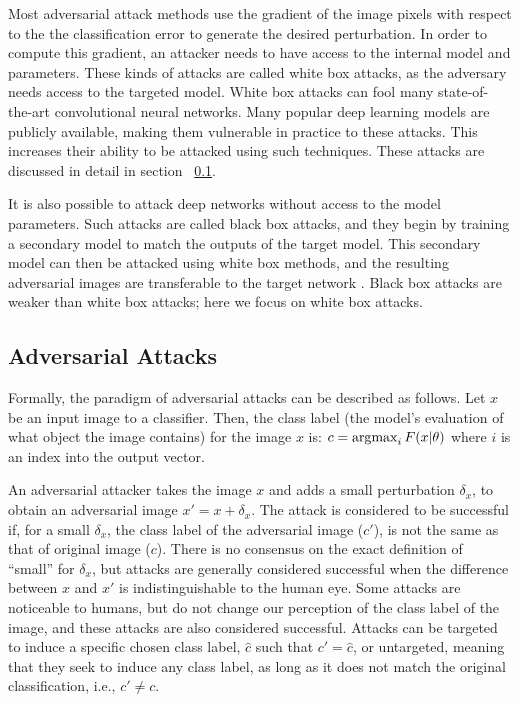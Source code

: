 Most adversarial attack methods use the gradient of the image pixels with respect to the the classification error to generate the desired perturbation.
In order to compute this gradient, an attacker needs to have access to the internal model and parameters.
These kinds of attacks are called white box attacks, as the adversary needs access to the targeted model. 
White box attacks can fool many state-of-the-art convolutional neural networks. 
Many popular deep learning models are publicly available, making them vulnerable in practice to these attacks.
This increases their ability to be attacked using such techniques.
These attacks are discussed in detail in section  ~\ref{attacks}.

It is also possible to attack deep networks without access to the model parameters. 
Such attacks are called black box attacks, and they begin by training a secondary model to match the outputs of the target model.
This secondary model can then be attacked using white box methods, and the resulting adversarial images are transferable to the target network \cite{Papernot2016PracticalBA}. 
Black box attacks are weaker than white box attacks; here we focus on white box attacks. 

\subsection{Adversarial Attacks} \label{attacks}
Formally, the paradigm of adversarial attacks can be described as follows. 
Let $x$ be an input image to a classifier. 
Then, the class label (the model's evaluation of what object the image contains) for the image $x$ is: $c = \operatorname*{\arg\!\max}_{i} F(x|\theta)$ where $i$ is an index into the output vector.

An adversarial attacker takes the image $x$ and adds a small perturbation $\delta_x$, to obtain an adversarial image $x' = x + \delta_x$.
The attack is considered to be successful if, for a small $\delta_x$, the class label of the adversarial image ($c'$), is not the same as that of original image ($c$). 
There is no consensus on the exact definition of  ``small'' for $\delta_x$, but attacks are generally considered successful when the difference between $x$ and $x'$ is indistinguishable to the human eye. Some attacks are noticeable to humans, but do not change our perception of the class label of the image, and these attacks are also considered successful.  %
Attacks can be targeted to induce a specific chosen class label, $\hat{c}$ such that $c' = \hat{c}$, or untargeted, meaning that they seek to induce any class label, as long as it does not match the original classification, i.e., $c' \neq c$.

